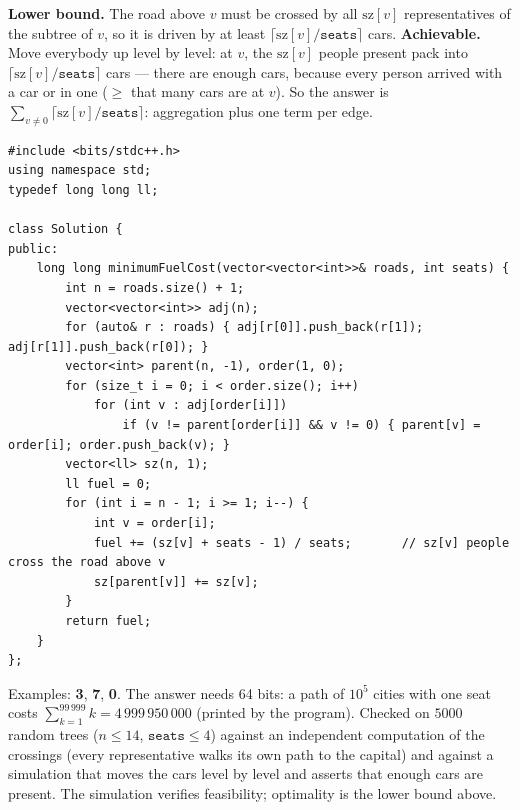 \begin{solutionbox}
\textbf{Lower bound.} The road above $v$ must be crossed by all $\mathrm{sz}[v]$ representatives of the subtree of $v$, so it is driven by at least $\lceil \mathrm{sz}[v] / \texttt{seats} \rceil$ cars. \textbf{Achievable.} Move everybody up level by level: at $v$, the $\mathrm{sz}[v]$ people present pack into $\lceil \mathrm{sz}[v]/\texttt{seats} \rceil$ cars --- there are enough cars, because every person arrived with a car or in one ($\ge$ that many cars are at $v$). So the answer is $\sum_{v \ne 0} \lceil \mathrm{sz}[v] / \texttt{seats} \rceil$: aggregation plus one term per edge.
\begin{lstlisting}[style=cpp]
#include <bits/stdc++.h>
using namespace std;
typedef long long ll;

class Solution {
public:
    long long minimumFuelCost(vector<vector<int>>& roads, int seats) {
        int n = roads.size() + 1;
        vector<vector<int>> adj(n);
        for (auto& r : roads) { adj[r[0]].push_back(r[1]); adj[r[1]].push_back(r[0]); }
        vector<int> parent(n, -1), order(1, 0);
        for (size_t i = 0; i < order.size(); i++)
            for (int v : adj[order[i]])
                if (v != parent[order[i]] && v != 0) { parent[v] = order[i]; order.push_back(v); }
        vector<ll> sz(n, 1);
        ll fuel = 0;
        for (int i = n - 1; i >= 1; i--) {
            int v = order[i];
            fuel += (sz[v] + seats - 1) / seats;       // sz[v] people cross the road above v
            sz[parent[v]] += sz[v];
        }
        return fuel;
    }
};
\end{lstlisting}
Examples: \textbf{3}, \textbf{7}, \textbf{0}. The answer needs 64 bits: a path of $10^5$ cities with one seat costs $\sum_{k=1}^{99\,999} k = 4\,999\,950\,000$ (printed by the program). Checked on $5000$ random trees ($n \le 14$, $\texttt{seats} \le 4$) against an independent computation of the crossings (every representative walks its own path to the capital) and against a simulation that moves the cars level by level and asserts that enough cars are present. The simulation verifies feasibility; optimality is the lower bound above.
\end{solutionbox}

